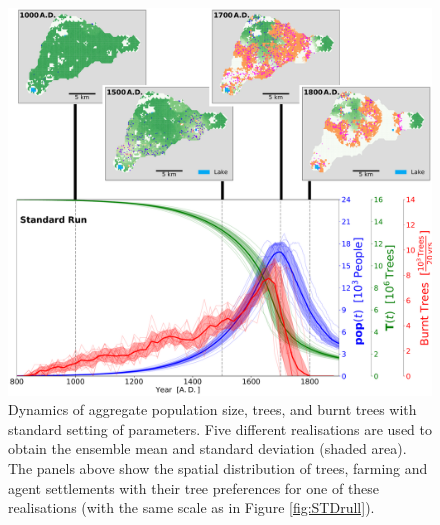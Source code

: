 \begin{figure}
	\centering
	\includegraphics[width=1.3\linewidth, center]{images/Results/Standard/EnsembleStatistics+Panels}
	\caption{Dynamics of aggregate population size, trees, and burnt trees with standard setting of parameters. Five different realisations are used to obtain the ensemble mean and standard deviation (shaded area). The panels above show the spatial distribution of trees, farming and agent settlements with their tree preferences for one of these realisations (with the same scale as in Figure \ref{fig:STDrull}). }
	\label{fig:STDstats}
\end{figure}


